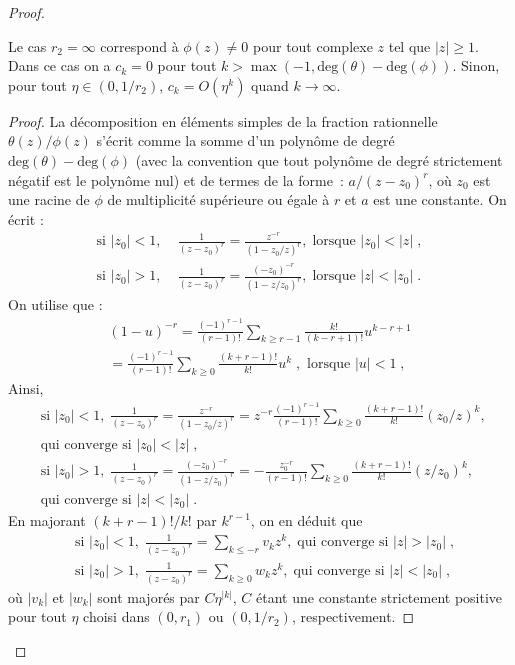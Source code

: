 \begin{proof}
\begin{lemma}
Le cas $r_2=\infty$ correspond \`a $\phi(z)\neq0$ pour tout complexe $z$ tel que
$|z|\geq1$. Dans ce cas on a $c_k=0$ pour tout $k>\max(-1,\mathrm{deg}(\theta)
- \mathrm{deg}(\phi))$.  Sinon, pour tout $\eta\in(0,1/r_2)$, $c_k=O(\eta^{k})$
quand $k\to\infty$.
\end{lemma}
\begin{proof}\smartqed
  La d\'ecomposition en \'el\'ements simples de la fraction rationnelle
  $\theta(z)/\phi(z)$ s'\'ecrit comme la somme d'un polyn\^ome de degr\'e
  $\mathrm{deg}(\theta) - \mathrm{deg}(\phi)$ (avec la convention que tout
  polyn\^ome de degr\'e strictement n\'egatif est le polyn\^ome nul) et de termes de la forme~:
  $a/(z-z_0)^r$, o\`u $z_0$ est une racine de $\phi$ de multiplicit\'e sup\'erieure
  ou \'egale \`a $r$ et $a$ est une constante.  On \'ecrit :
\begin{align*}
\textrm{si }|z_0|<1,& \;
\frac{1}{(z-z_0)^r}=\frac{z^{-r}}{(1-z_0/z)^r},\;
\textrm{lorsque }|z_0|<|z|\;,\\
\textrm{si }|z_0|>1,& \;
\frac{1}{(z-z_0)^r}=\frac{(-z_0)^{-r}}{(1-z/z_0)^r},\;
\textrm{lorsque }|z|<|z_0|\;.
\end{align*}
On utilise que :
\begin{multline*}
(1-u)^{-r}=\frac{(-1)^{r-1}}{(r-1)!}\sum_{k\geq r-1}\frac{k!}{(k-r+1)!}
u^{k-r+1}\\
=\frac{(-1)^{r-1}}{(r-1)!}\sum_{k\geq 0}\frac{(k+r-1)!}{k!}
u^{k}\;,\textrm{ lorsque }|u|<1\;,
\end{multline*}
Ainsi,
\begin{align*}
&\textrm{si }|z_0|<1, \;
\frac{1}{(z-z_0)^r}=\frac{z^{-r}}{(1-z_0/z)^r}
=z^{-r}\frac{(-1)^{r-1}}{(r-1)!}\sum_{k\geq 0}\frac{(k+r-1)!}{k!}(z_0/z)^k,\; \\
&\textrm{qui converge si }|z_0|<|z|\;,\\
&\textrm{si }|z_0|>1, \;
\frac{1}{(z-z_0)^r}=\frac{(-z_0)^{-r}}{(1-z/z_0)^r}
=-\frac{z_0^{-r}}{(r-1)!}\sum_{k\geq 0}\frac{(k+r-1)!}{k!}
(z/z_0)^k,\; \\
&\textrm{qui converge si }|z|<|z_0|\;.
\end{align*}
En majorant $(k+r-1)!/k!$ par $k^{r-1}$, on en d\'eduit  que
\begin{align*}
&\textrm{si }|z_0|<1, \;
\frac{1}{(z-z_0)^r}=\sum_{k\leq -r} v_k z^k,\; \textrm{qui converge si }|z|>|z_0|\;,\\
&\textrm{si }|z_0|>1, \;
\frac{1}{(z-z_0)^r}=\sum_{k\geq 0} w_k z^k,\;\textrm{qui converge si }|z|<|z_0|\;,
\end{align*}
o\`u $|v_k|$ et $|w_k|$ sont major\'es par $C \eta^{|k|}$, $C$ \'etant une constante
strictement positive pour tout $\eta$ choisi dans
$(0,r_1)$ ou $(0,1/r_2)$, respectivement.


\end{proof}
\end{proof}
